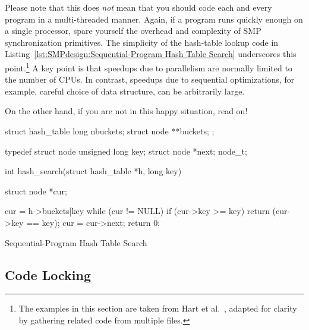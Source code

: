 Please note that this does \emph{not} mean that you should code each
and every program in a multi-threaded manner.
Again, if a program runs quickly enough on a single processor,
spare yourself the overhead and complexity of SMP synchronization
primitives.
The simplicity of the hash-table lookup code in
Listing~\ref{lst:SMPdesign:Sequential-Program Hash Table Search}
underscores this point.\footnote{
	The examples in this section are taken from Hart et
	al.~\cite{ThomasEHart2006a}, adapted for clarity
	by gathering related code from multiple files.}
A key point is that speedups due to parallelism are normally
limited to the number of CPUs.
In contrast, speedups due to sequential optimizations, for example,
careful choice of data structure, can be arbitrarily large.

On the other hand, if you are not in this happy situation, read on!

\begin{listing}
\begin{VerbatimL}[commandchars=\\\[\]]
struct hash_table
{
	long nbuckets;
	struct node **buckets;
};

typedef struct node {
	unsigned long key;
	struct node *next;
} node_t;

int hash_search(struct hash_table *h, long key)
{
	struct node *cur;

	cur = h->buckets[key %
	while (cur != NULL) {
		if (cur->key >= key) {
			return (cur->key == key);
		}
		cur = cur->next;
	}
	return 0;
}
\end{VerbatimL}
\caption{Sequential-Program Hash Table Search}
\label{lst:SMPdesign:Sequential-Program Hash Table Search}
\end{listing}


\subsection{Code Locking}
\label{sec:SMPdesign:Code Locking}


